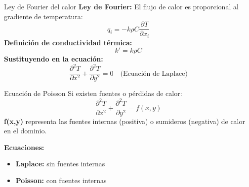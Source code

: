 \documentclass[main.tex]{subfiles}
\begin{document}
\begin{frame}{Ley de Fourier del calor}
\small
\textbf{Ley de Fourier:} El flujo de calor es proporcional al gradiente de temperatura:
\[
q_i = -k \rho C \frac{\partial T}{\partial x_i}
\]
\textbf{Definición de conductividad térmica:}
\[
k' = k \rho C
\]
\textbf{Sustituyendo en la ecuación:}
\[
\frac{\partial^2 T}{\partial x^2} + \frac{\partial^2 T}{\partial y^2} = 0 \quad \text{(Ecuación de Laplace)}
\]
\end{frame}

\begin{frame}{Ecuación de Poisson}
\small
Si existen fuentes o pérdidas de calor:
\[
\frac{\partial^2 T}{\partial x^2} + \frac{\partial^2 T}{\partial y^2} = f(x, y)
\]
\textbf{f(x,y)} representa las fuentes internas (positiva) o sumideros (negativa) de calor en el dominio.

\textbf{Ecuaciones:}
\begin{itemize}
  \item \textbf{Laplace:} sin fuentes internas
  \item \textbf{Poisson:} con fuentes internas
\end{itemize}
\end{frame}
\end{document}
